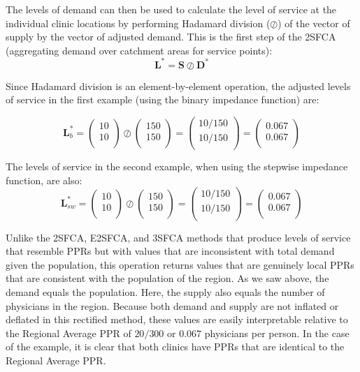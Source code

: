 \documentclass[10pt,letterpaper]{article}
\begin{document}
The levels of demand can then be used to calculate the level of service
at the individual clinic locations by performing Hadamard division
(\(\oslash\)) of the vector of supply by the vector of adjusted demand.
This is the first step of the 2SFCA (aggregating demand over catchment
areas for service points): \[
\mathbf{L}^* = \mathbf{S}\oslash\mathbf{D}^*
\]

Since Hadamard division is an element-by-element operation, the adjusted
levels of service in the first example (using the binary impedance
function) are:

\[
\mathbf{L}^*_{b} = \left( \begin{array}{c}
10 \\
10 \\
\end{array}\right)\oslash
\left( \begin{array}{c}
150\\
150\\
\end{array} \right)=
\left( \begin{array}{c}
10/150\\
10/150\\
\end{array} \right)=
\left( \begin{array}{c}
0.067\\
0.067\\
\end{array} \right)
\]

The levels of service in the second example, when using the stepwise
impedance function, are also: \[
\mathbf{L}^*_{sw} = \left( \begin{array}{c}
10 \\
10 \\
\end{array}\right)\oslash
\left( \begin{array}{c}
150\\
150\\
\end{array} \right)=
\left( \begin{array}{c}
10/150\\
10/150\\
\end{array} \right)=
\left( \begin{array}{c}
0.067\\
0.067\\
\end{array} \right)
\]

Unlike the 2SFCA, E2SFCA, and 3SFCA methods that produce levels of
service that resemble PPRs but with values that are inconsistent with
total demand given the population, this operation returns values that
are genuinely local PPRs that are consistent with the population of the
region. As we saw above, the demand equals the population. Here, the
supply also equals the number of physicians in the region. Because both
demand and supply are not inflated or deflated in this rectified method,
these values are easily interpretable relative to the Regional Average
PPR of \(20/300\) or \(0.067\) physicians per person. In the case of the
example, it is clear that both clinics have PPRs that are identical to
the Regional Average PPR.
\end{document}
